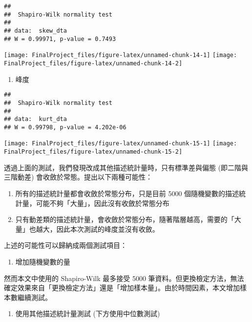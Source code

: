 \documentclass[]{article}
\providecommand{\tightlist}{%
  \setlength{\itemsep}{0pt}\setlength{\parskip}{0pt}}
\begin{document}
\begin{verbatim}
## 
##  Shapiro-Wilk normality test
## 
## data:  skew_dta
## W = 0.99971, p-value = 0.7493
\end{verbatim}

\texttt{[image: FinalProject\_files/figure-latex/unnamed-chunk-14-1]}
\texttt{[image: FinalProject\_files/figure-latex/unnamed-chunk-14-2]}

\begin{enumerate}
\def\labelenumi{\arabic{enumi}.}
\setcounter{enumi}{4}
\tightlist
\item
  峰度
\end{enumerate}

\begin{verbatim}
## 
##  Shapiro-Wilk normality test
## 
## data:  kurt_dta
## W = 0.99798, p-value = 4.202e-06
\end{verbatim}

\texttt{[image: FinalProject\_files/figure-latex/unnamed-chunk-15-1]}
\texttt{[image: FinalProject\_files/figure-latex/unnamed-chunk-15-2]}

透過上面的測試，我們發現改成其他描述統計量時，只有標準差與偏態
(即二階與三階動差) 會收斂於常態。提出以下兩種可能性：

\begin{enumerate}
\def\labelenumi{\arabic{enumi}.}
\tightlist
\item
  所有的描述統計量都會收斂於常態分布，只是目前 5000
  個隨機變數的描述統計量，可能不夠「大量」，因此沒有收斂於常態分布
\item
  只有動差類的描述統計量，會收斂於常態分布，隨著階層越高，需要的「大量」也越大，因此本次測試的峰度並沒有收斂。
\end{enumerate}

上述的可能性可以歸納成兩個測試項目：

\begin{enumerate}
\def\labelenumi{\arabic{enumi}.}
\tightlist
\item
  增加隨機變數的量
\end{enumerate}

然而本文中使用的 Shapiro-Wilk 最多接受 5000
筆資料。但更換檢定方法，無法確定效果來自「更換檢定方法」還是「增加樣本量」。由於時間因素，本文增加樣本數繼續測試。

\begin{enumerate}
\def\labelenumi{\arabic{enumi}.}
\setcounter{enumi}{1}
\tightlist
\item
  使用其他描述統計量測試 (下方使用中位數測試)
\end{enumerate}
\end{document}
